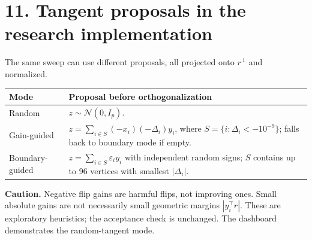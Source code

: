\documentclass[11pt]{article}
\newcommand{\sect}[1]{\section*{\textcolor{ink}{#1}}}
\begin{document}
\sect{11. Tangent proposals in the research implementation}
The same sweep can use different proposals, all projected onto $r^\perp$ and normalized.
\begin{center}\small
\begin{tabular}{@{}p{.22\linewidth}p{.71\linewidth}@{}}\toprule
Mode & Proposal before orthogonalization\\\midrule
Random & $z\sim\mathcal N(0,I_p)$.\\
Gain-guided & $z=\sum_{i\in S}(-x_i)(-\Delta_i)y_i$, where $S=\{i:\Delta_i<-10^{-9}\}$; falls back to boundary mode if empty.\\
Boundary-guided & $z=\sum_{i\in S}\varepsilon_i y_i$ with independent random signs; $S$ contains up to 96 vertices with smallest $|\Delta_i|$.\\\bottomrule
\end{tabular}
\end{center}
\textbf{Caution.} Negative flip gains are harmful flips, not improving ones. Small absolute gains are not necessarily small geometric margins $|y_i^\top r|$. These are exploratory heuristics; the acceptance check is unchanged. The dashboard demonstrates the random-tangent mode.
\end{document}
